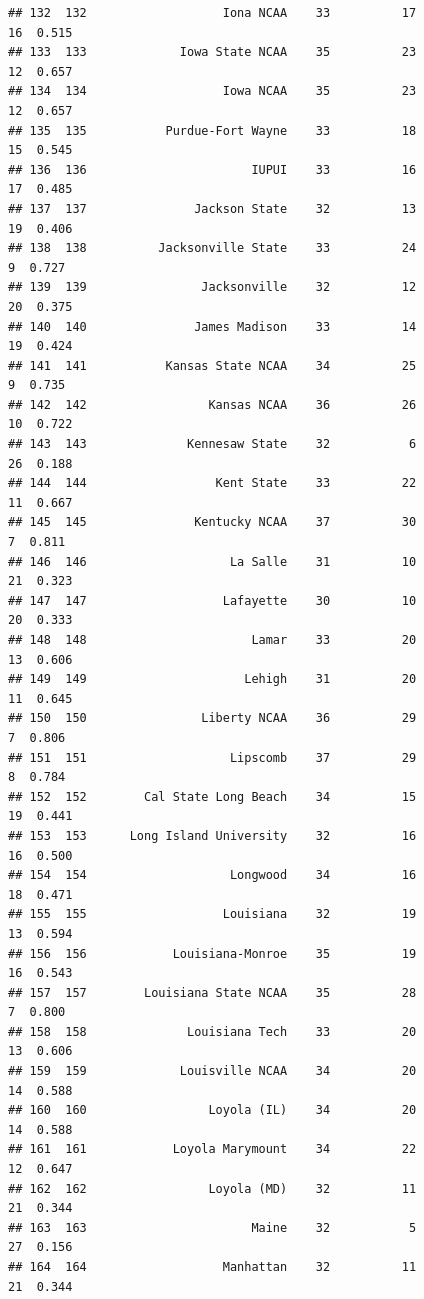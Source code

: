 \documentclass[]{book}
\begin{document}
\begin{verbatim}
## 132  132                   Iona NCAA    33          17            16  0.515
## 133  133             Iowa State NCAA    35          23            12  0.657
## 134  134                   Iowa NCAA    35          23            12  0.657
## 135  135           Purdue-Fort Wayne    33          18            15  0.545
## 136  136                       IUPUI    33          16            17  0.485
## 137  137               Jackson State    32          13            19  0.406
## 138  138          Jacksonville State    33          24             9  0.727
## 139  139                Jacksonville    32          12            20  0.375
## 140  140               James Madison    33          14            19  0.424
## 141  141           Kansas State NCAA    34          25             9  0.735
## 142  142                 Kansas NCAA    36          26            10  0.722
## 143  143              Kennesaw State    32           6            26  0.188
## 144  144                  Kent State    33          22            11  0.667
## 145  145               Kentucky NCAA    37          30             7  0.811
## 146  146                    La Salle    31          10            21  0.323
## 147  147                   Lafayette    30          10            20  0.333
## 148  148                       Lamar    33          20            13  0.606
## 149  149                      Lehigh    31          20            11  0.645
## 150  150                Liberty NCAA    36          29             7  0.806
## 151  151                    Lipscomb    37          29             8  0.784
## 152  152        Cal State Long Beach    34          15            19  0.441
## 153  153      Long Island University    32          16            16  0.500
## 154  154                    Longwood    34          16            18  0.471
## 155  155                   Louisiana    32          19            13  0.594
## 156  156            Louisiana-Monroe    35          19            16  0.543
## 157  157        Louisiana State NCAA    35          28             7  0.800
## 158  158              Louisiana Tech    33          20            13  0.606
## 159  159             Louisville NCAA    34          20            14  0.588
## 160  160                 Loyola (IL)    34          20            14  0.588
## 161  161            Loyola Marymount    34          22            12  0.647
## 162  162                 Loyola (MD)    32          11            21  0.344
## 163  163                       Maine    32           5            27  0.156
## 164  164                   Manhattan    32          11            21  0.344

\end{verbatim}
\end{document}
